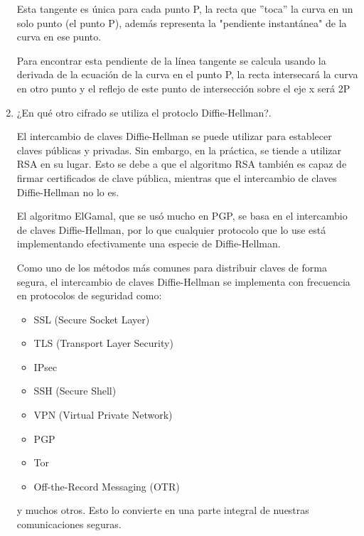 \documentclass{article}
\begin{document}
\begin{enumerate}
    Esta tangente es única para cada punto P, la recta que ''toca'' la curva en un solo punto (el punto P), además representa la "pendiente instantánea" de la curva en ese punto.

    Para encontrar esta pendiente de la línea tangente se calcula usando la derivada de la ecuación de la curva en el punto P, la recta intersecará la curva en otro punto y el reflejo de este punto de intersección sobre el eje x será 2P

    \item ¿En qué otro cifrado se utiliza el protoclo Diffie-Hellman?. 

    El intercambio de claves Diffie-Hellman se puede utilizar para establecer claves públicas y privadas. Sin embargo, en la práctica, se tiende a utilizar RSA en su lugar. Esto se debe a que el algoritmo RSA también es capaz de firmar certificados de clave pública, mientras que el intercambio de claves Diffie-Hellman no lo es.

    El algoritmo ElGamal, que se usó mucho en PGP, se basa en el intercambio de claves Diffie-Hellman, por lo que cualquier protocolo que lo use está implementando efectivamente una especie de Diffie-Hellman.

    Como uno de los métodos más comunes para distribuir claves de forma segura, el intercambio de claves Diffie-Hellman se implementa con frecuencia en protocolos de seguridad como:

    \begin{itemize}
        \item SSL (Secure Socket Layer)

        \item TLS (Transport Layer Security)

        \item IPsec

        \item SSH (Secure Shell)

        \item VPN (Virtual Private Network)

        \item PGP

        \item Tor
        
        \item Off-the-Record Messaging (OTR)
    \end{itemize}

    y muchos otros. Esto lo convierte en una parte integral de nuestras comunicaciones seguras.


\end{enumerate}
\end{document}
